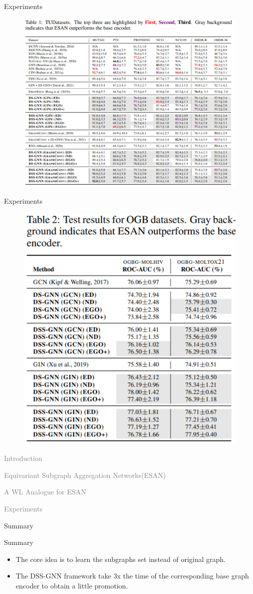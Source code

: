 \documentclass[aspectratio=169,mathserif]{beamer}  %
\newcommand{\light}[1]{\textcolor{gray}{#1}}
\begin{document}
\begin{frame}{Experiments}

\begin{figure}[t]
\centerline{\includegraphics[width=0.68\linewidth]{figure7.png}}
\end{figure}

\end{frame}



\begin{frame}{Experiments}

\begin{figure}[t]
\centerline{\includegraphics[width=0.45\linewidth]{figure8.png}}
\end{figure}

\end{frame}



\begin{frame}[noframenumbering]
\begin{itemize}
    \begin{LARGE}
    \item \light{Introduction}
    \item \light{Equivariant Subgraph Aggregation Networks(ESAN)}
    \item \light{A WL Analogue for ESAN}
    \item \light{Experiments}
    \item Summary
    \end{LARGE}
\end{itemize}
\end{frame}



\begin{frame}{Summary}

\begin{itemize}[<+->]
    \item The core idea is to learn the subgraphs set instead of original graph.
    \item The DSS-GNN framework take 3x the time of the corresponding base graph encoder to obtain a little promotion.
\end{itemize}

\end{frame}
\end{document}
